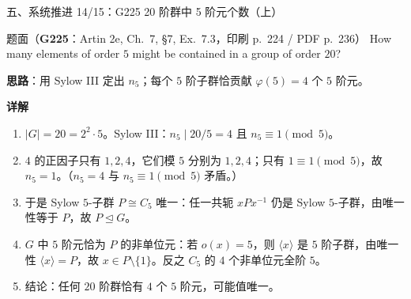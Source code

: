 \documentclass[aspectratio=169,10pt,fontset=none]{ctexbeamer}
\newcommand{\ex}[1]{\textcolor{accent}{\footnotesize\bfseries #1}}
\newcommand{\key}[1]{\textcolor{ink}{\bfseries #1}}
\begin{document}
\begin{frame}[t]{五、系统推进 14/15：G225 20 阶群中 5 阶元个数（上）}
\label{ex:G225}\leavevmode
\scriptsize
\begin{block}{\footnotesize 题面（\ex{G225}：Artin 2e, Ch.~7, \S7, Ex.~7.3，印刷 p.~224 / PDF p.~236）}
How many elements of order $5$ might be contained in a group of order $20$?
\end{block}
\key{思路}：用 Sylow III 定出 $n_5$；每个 $5$ 阶子群恰贡献 $\varphi(5)=4$ 个 $5$ 阶元。

\key{详解}
\begin{enumerate}
  \item $|G|=20=2^2\cdot5$。Sylow III：$n_5\mid20/5=4$ 且 $n_5\equiv1\pmod5$。
  \item $4$ 的正因子只有 $1,2,4$，它们模 $5$ 分别为 $1,2,4$；只有 $1\equiv1\pmod5$，故 $n_5=1$。（$n_5=4$ 与 $n_5\equiv1\pmod5$ 矛盾。）
  \item 于是 Sylow $5$-子群 $P\cong C_5$ 唯一：任一共轭 $xPx^{-1}$ 仍是 Sylow $5$-子群，由唯一性等于 $P$，故 $P\trianglelefteq G$。
  \item $G$ 中 $5$ 阶元恰为 $P$ 的非单位元：若 $o(x)=5$，则 $\langle x\rangle$ 是 $5$ 阶子群，由唯一性 $\langle x\rangle=P$，故 $x\in P\setminus\{1\}$。反之 $C_5$ 的 $4$ 个非单位元全阶 $5$。
  \item 结论：任何 $20$ 阶群恰有 $\boxed{4}$ 个 $5$ 阶元，可能值唯一。
\end{enumerate}
\end{frame}
\end{document}
